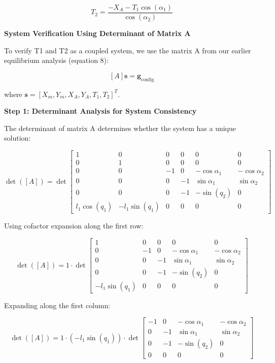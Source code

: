 \begin{equation}
\boxed{T_2 = \frac{-X_A - T_1 \cos(\alpha_1)}{\cos(\alpha_2)}}
\label{eq:T2_horizontal_constraint}
\end{equation}

\textbf{System Verification Using Determinant of Matrix A}

To verify T1 and T2 as a coupled system, we use the matrix A from our earlier equilibrium analysis (equation 8):

$$[A] \mathbf{s} = \mathbf{g}_{\text{config}}$$

where $\mathbf{s} = [X_m, Y_m, X_A, Y_A, T_1, T_2]^T$.

\textbf{Step 1: Determinant Analysis for System Consistency}

The determinant of matrix A determines whether the system has a unique solution:

$$\det([A]) = \det\begin{bmatrix}
1 & 0 & 0 & 0 & 0 & 0 \\
0 & 1 & 0 & 0 & 0 & 0 \\
0 & 0 & -1 & 0 & -\cos\alpha_1 & -\cos\alpha_2 \\
0 & 0 & 0 & -1 & \sin\alpha_1 & \sin\alpha_2 \\
0 & 0 & 0 & -1 & -\sin(q_2) & 0 \\
l_1\cos(q_1) & -l_1\sin(q_1) & 0 & 0 & 0 & 0
\end{bmatrix}$$

Using cofactor expansion along the first row:

$$\det([A]) = 1 \cdot \det\begin{bmatrix}
1 & 0 & 0 & 0 & 0 \\
0 & -1 & 0 & -\cos\alpha_1 & -\cos\alpha_2 \\
0 & 0 & -1 & \sin\alpha_1 & \sin\alpha_2 \\
0 & 0 & -1 & -\sin(q_2) & 0 \\
-l_1\sin(q_1) & 0 & 0 & 0 & 0
\end{bmatrix}$$

Expanding along the first column:

$$\det([A]) = 1 \cdot (-l_1\sin(q_1)) \cdot \det\begin{bmatrix}
-1 & 0 & -\cos\alpha_1 & -\cos\alpha_2 \\
0 & -1 & \sin\alpha_1 & \sin\alpha_2 \\
0 & -1 & -\sin(q_2) & 0 \\
0 & 0 & 0 & 0
\end{bmatrix}$$

